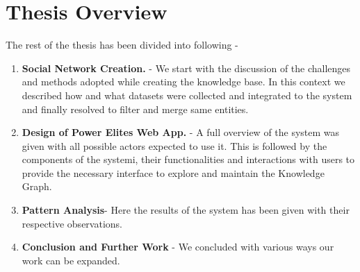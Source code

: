 \section{Thesis Overview}
The rest of the thesis has been divided into following -
\begin{enumerate}
    \item \textbf{Social Network Creation.} -  We start with the discussion of the challenges and methods adopted while  creating the knowledge base. In this context we described how and what datasets were collected and integrated to the system and finally resolved to filter and merge same entities.
    \item \textbf{Design of Power Elites Web App.}  -  A full overview of the system was given with all possible actors expected to use it. This is followed by the components  of the systemi, their functionalities and interactions with users to provide the necessary interface to explore and maintain the Knowledge Graph.

    \item \textbf{Pattern Analysis}- Here the results of the system has been given with their respective observations. 
    \item \textbf{Conclusion and Further Work} - We concluded with various ways our work can be expanded.

\end{enumerate}



%
%
